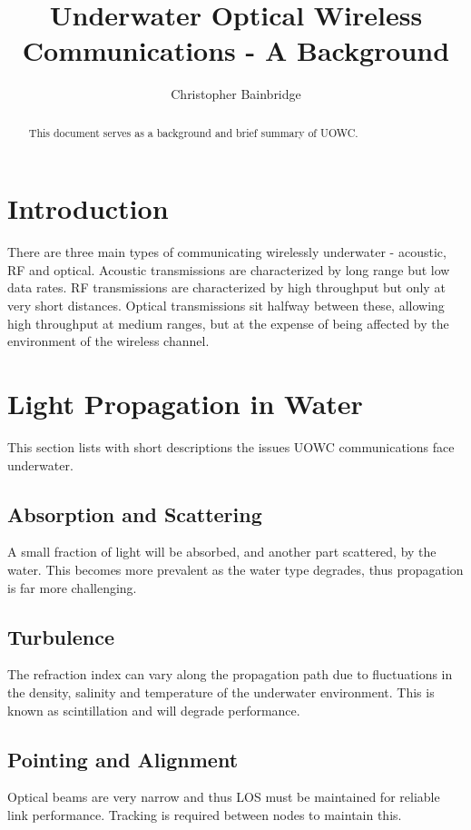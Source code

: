 \documentclass{article}
\author{Christopher Bainbridge}
\title{Underwater Optical Wireless Communications - A Background}
\begin{document}
\maketitle

\begin{abstract}
This document serves as a background and brief summary of \ac{UOWC}. 
\end{abstract}

\section{Introduction}
There are three main types of communicating wirelessly underwater - acoustic, RF and optical. Acoustic transmissions are characterized by long range but low data rates. RF transmissions are characterized by high throughput but only at very short distances. Optical transmissions sit halfway between these, allowing high throughput at medium ranges, but at the expense of being affected by the environment of the wireless channel.

\section{Light Propagation in Water}
This section lists with short descriptions the issues \ac{UOWC} communications face underwater.

\subsection{Absorption and Scattering}
A small fraction of light will be absorbed, and another part scattered, by the water. This becomes more prevalent as the water type degrades, thus propagation is far more challenging.

\subsection{Turbulence}
The refraction index can vary along the propagation path due to fluctuations in the density, salinity and temperature of the underwater environment. This is known as scintillation and will degrade performance.

\subsection{Pointing and Alignment}
Optical beams are very narrow and thus LOS must be maintained for reliable link performance. Tracking is required between nodes to maintain this.
\end{document}
